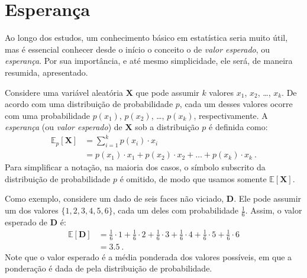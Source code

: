 \documentclass{article}
\newcommand*{\RandomVariable}[1]{\mathbf{#1}}
\newcommand*{\ExpectedValue}{\mathbb{E}}
\begin{document}
    \section{Esperança}
            
        Ao longo dos estudos, um conhecimento básico em estatística seria muito útil, mas é essencial conhecer desde o início o conceito o de \emph{valor esperado}, ou \emph{esperança}. Por sua importância, e até mesmo simplicidade, ele será, de maneira resumida, apresentado.
        
        Considere uma variável aleatória $\RandomVariable{X}$ que pode assumir $k$ valores $x_1$, $x_2$, \dots, $x_k$. De acordo com uma distribuição de probabilidade $p$, cada um desses valores ocorre com uma probabilidade $p(x_1)$, $p(x_2)$, \dots, $p(x_k)$, respectivamente. A \emph{esperança} (ou \emph{valor esperado}) de $\RandomVariable{X}$ sob a distribuição $p$ é definida como:
        \begin{equation}
        \begin{aligned}
            \label{eq:state-value}
            \ExpectedValue_p[\RandomVariable{X}] & = \sum_{i=1}^k p(x_i) \cdot x_i \\
            & = p(x_1) \cdot x_1 + p(x_2) \cdot x_2 + \dots + p(x_k) \cdot x_k\ .
        \end{aligned}
        \end{equation}
        Para simplificar a notação, na maioria dos casos, o símbolo subscrito da distribuição de probabilidade $p$ é omitido, de modo que usamos somente $\ExpectedValue[\RandomVariable{X}]$.

        Como exemplo, considere um dado de seis faces não viciado, $\RandomVariable{D}$. Ele pode assumir um dos valores $\{1, 2, 3, 4, 5, 6\}$, cada um deles com probabilidade $\frac{1}{6}$. Assim, o valor esperado de $\RandomVariable{D}$ é:
        \begin{equation*}
        \begin{aligned}
            \ExpectedValue[\RandomVariable{D}] & = \frac{1}{6} \cdot 1 + \frac{1}{6} \cdot 2 + \frac{1}{6} \cdot 3 + \frac{1}{6} \cdot 4 + \frac{1}{6} \cdot 5 + \frac{1}{6} \cdot 6 \\
            & = 3.5\ .
        \end{aligned}
        \end{equation*}        
        Note que o valor esperado é a média ponderada dos valores possíveis, em que a ponderação é dada de pela distribuição de probabilidade.
    
\end{document}
